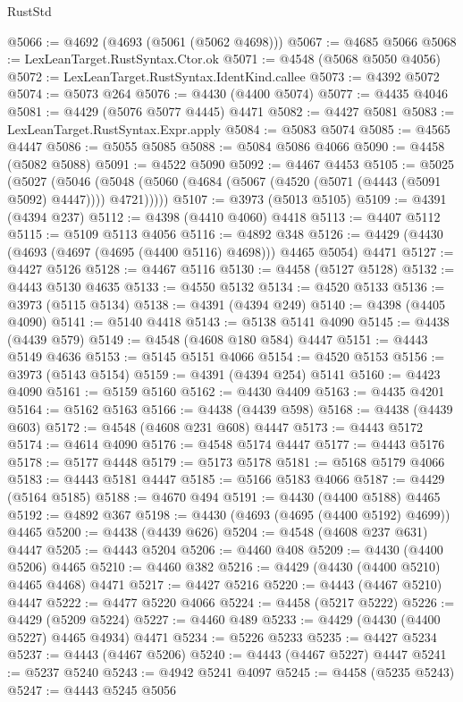 \begin{lexlean}{RustStd}
\begin{coremodule}
@5066 := @4692 (@4693 (@5061 (@5062 @4698)))
@5067 := @4685 @5066
@5068 := LexLeanTarget.RustSyntax.Ctor.ok
@5071 := @4548 (@5068 @5050 @4056)
@5072 := LexLeanTarget.RustSyntax.IdentKind.callee
@5073 := @4392 @5072
@5074 := @5073 @264
@5076 := @4430 (@4400 @5074)
@5077 := @4435 @4046
@5081 := @4429 (@5076 @5077 @4445) @4471
@5082 := @4427 @5081
@5083 := LexLeanTarget.RustSyntax.Expr.apply
@5084 := @5083 @5074
@5085 := @4565 @4447
@5086 := @5055 @5085
@5088 := @5084 @5086 @4066
@5090 := @4458 (@5082 @5088)
@5091 := @4522 @5090
@5092 := @4467 @4453
@5105 := @5025
    (@5027
      (@5046 (@5048 (@5060 (@4684 (@5067 (@4520 (@5071 (@4443 (@5091 @5092) @4447)))) @4721)))))
@5107 := @3973 (@5013 @5105)
@5109 := @4391 (@4394 @237)
@5112 := @4398 (@4410 @4060) @4418
@5113 := @4407 @5112
@5115 := @5109 @5113 @4056
@5116 := @4892 @348
@5126 := @4429 (@4430 (@4693 (@4697 (@4695 (@4400 @5116) @4698))) @4465 @5054) @4471
@5127 := @4427 @5126
@5128 := @4467 @5116
@5130 := @4458 (@5127 @5128)
@5132 := @4443 @5130 @4635
@5133 := @4550 @5132
@5134 := @4520 @5133
@5136 := @3973 (@5115 @5134)
@5138 := @4391 (@4394 @249)
@5140 := @4398 (@4405 @4090)
@5141 := @5140 @4418
@5143 := @5138 @5141 @4090
@5145 := @4438 (@4439 @579)
@5149 := @4548 (@4608 @180 @584) @4447
@5151 := @4443 @5149 @4636
@5153 := @5145 @5151 @4066
@5154 := @4520 @5153
@5156 := @3973 (@5143 @5154)
@5159 := @4391 (@4394 @254) @5141
@5160 := @4423 @4090
@5161 := @5159 @5160
@5162 := @4430 @4409
@5163 := @4435 @4201
@5164 := @5162 @5163
@5166 := @4438 (@4439 @598)
@5168 := @4438 (@4439 @603)
@5172 := @4548 (@4608 @231 @608) @4447
@5173 := @4443 @5172
@5174 := @4614 @4090
@5176 := @4548 @5174 @4447
@5177 := @4443 @5176
@5178 := @5177 @4448
@5179 := @5173 @5178
@5181 := @5168 @5179 @4066
@5183 := @4443 @5181 @4447
@5185 := @5166 @5183 @4066
@5187 := @4429 (@5164 @5185)
@5188 := @4670 @494
@5191 := @4430 (@4400 @5188) @4465
@5192 := @4892 @367
@5198 := @4430 (@4693 (@4695 (@4400 @5192) @4699)) @4465
@5200 := @4438 (@4439 @626)
@5204 := @4548 (@4608 @237 @631) @4447
@5205 := @4443 @5204
@5206 := @4460 @408
@5209 := @4430 (@4400 @5206) @4465
@5210 := @4460 @382
@5216 := @4429 (@4430 (@4400 @5210) @4465 @4468) @4471
@5217 := @4427 @5216
@5220 := @4443 (@4467 @5210) @4447
@5222 := @4477 @5220 @4066
@5224 := @4458 (@5217 @5222)
@5226 := @4429 (@5209 @5224)
@5227 := @4460 @489
@5233 := @4429 (@4430 (@4400 @5227) @4465 @4934) @4471
@5234 := @5226 @5233
@5235 := @4427 @5234
@5237 := @4443 (@4467 @5206)
@5240 := @4443 (@4467 @5227) @4447
@5241 := @5237 @5240
@5243 := @4942 @5241 @4097
@5245 := @4458 (@5235 @5243)
@5247 := @4443 @5245 @5056

\end{coremodule}
\end{lexlean}
